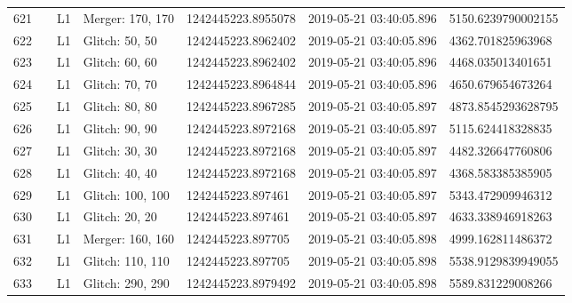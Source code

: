 \begin{longtable}{lllllll}
621  &                                                    &       L1 &  Merger: 170, 170 &  1242445223.8955078 &  2019-05-21 03:40:05.896 &  5150.6239790002155 \\
622  &                                                    &       L1 &    Glitch: 50, 50 &  1242445223.8962402 &  2019-05-21 03:40:05.896 &   4362.701825963968 \\
623  &                                                    &       L1 &    Glitch: 60, 60 &  1242445223.8962402 &  2019-05-21 03:40:05.896 &   4468.035013401651 \\
624  &                                                    &       L1 &    Glitch: 70, 70 &  1242445223.8964844 &  2019-05-21 03:40:05.896 &   4650.679654673264 \\
625  &                                                    &       L1 &    Glitch: 80, 80 &  1242445223.8967285 &  2019-05-21 03:40:05.897 &  4873.8545293628795 \\
626  &                                                    &       L1 &    Glitch: 90, 90 &  1242445223.8972168 &  2019-05-21 03:40:05.897 &   5115.624418328835 \\
627  &                                                    &       L1 &    Glitch: 30, 30 &  1242445223.8972168 &  2019-05-21 03:40:05.897 &   4482.326647760806 \\
628  &                                                    &       L1 &    Glitch: 40, 40 &  1242445223.8972168 &  2019-05-21 03:40:05.897 &   4368.583385385905 \\
629  &                                                    &       L1 &  Glitch: 100, 100 &   1242445223.897461 &  2019-05-21 03:40:05.897 &   5343.472909946312 \\
630  &                                                    &       L1 &    Glitch: 20, 20 &   1242445223.897461 &  2019-05-21 03:40:05.897 &   4633.338946918263 \\
631  &                                                    &       L1 &  Merger: 160, 160 &   1242445223.897705 &  2019-05-21 03:40:05.898 &   4999.162811486372 \\
632  &                                                    &       L1 &  Glitch: 110, 110 &   1242445223.897705 &  2019-05-21 03:40:05.898 &  5538.9129839949055 \\
633  &                                                    &       L1 &  Glitch: 290, 290 &  1242445223.8979492 &  2019-05-21 03:40:05.898 &   5589.831229008266 \\

\end{longtable}
